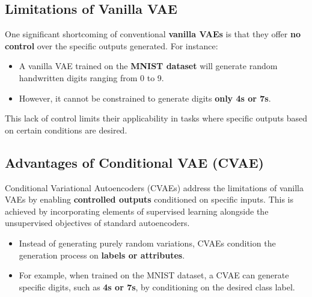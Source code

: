 \documentclass[a4paper,12pt]{article}
\begin{document}
\subsection{Limitations of Vanilla VAE}
One significant shortcoming of conventional \textbf{vanilla VAEs} is that they offer \textbf{no control} over the specific outputs generated. For instance:  
\begin{itemize}
    \item A vanilla VAE trained on the \textbf{MNIST dataset} will generate random handwritten digits ranging from 0 to 9.
    \item However, it cannot be constrained to generate digits \textbf{only 4s or 7s}.
\end{itemize}
This lack of control limits their applicability in tasks where specific outputs based on certain conditions are desired.

\subsection{Advantages of Conditional VAE (CVAE)}
Conditional Variational Autoencoders (CVAEs) address the limitations of vanilla VAEs by enabling \textbf{controlled outputs} conditioned on specific inputs. This is achieved by incorporating elements of supervised learning alongside the unsupervised objectives of standard autoencoders.

\begin{itemize}
    \item Instead of generating purely random variations, CVAEs condition the generation process on \textbf{labels or attributes}.
    \item For example, when trained on the MNIST dataset, a CVAE can generate specific digits, such as \textbf{4s or 7s}, by conditioning on the desired class label.
\end{itemize}
\end{document}
